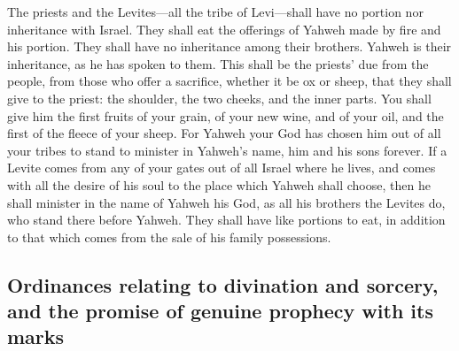  The priests and the Levites---all the tribe of
Levi---shall have no portion nor inheritance with Israel. They shall eat
the offerings of Yahweh made by fire and his portion. 
They shall have no inheritance among their brothers. Yahweh is their
inheritance, as he has spoken to them.  This shall be the
priests' due from the people, from those who offer a sacrifice, whether
it be ox or sheep, that they shall give to the priest: the shoulder, the
two cheeks, and the inner parts.  You shall give him the
first fruits of your grain, of your new wine, and of your oil, and the
first of the fleece of your sheep.  For Yahweh your God
has chosen him out of all your tribes to stand to minister in Yahweh's
name, him and his sons forever.  If a Levite comes from
any of your gates out of all Israel where he lives, and comes with all
the desire of his soul to the place which Yahweh shall choose,
 then he shall minister in the name of Yahweh his God, as
all his brothers the Levites do, who stand there before Yahweh.
 They shall have like portions to eat, in addition to that
which comes from the sale of his family possessions.

\hypertarget{ordinances-relating-to-divination-and-sorcery-and-the-promise-of-genuine-prophecy-with-its-marks}{%
\subsection{Ordinances relating to divination and sorcery, and the
promise of genuine prophecy with its
marks}\label{ordinances-relating-to-divination-and-sorcery-and-the-promise-of-genuine-prophecy-with-its-marks}}

